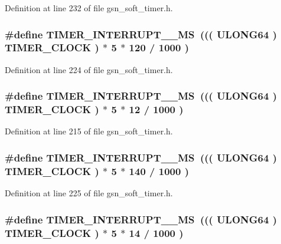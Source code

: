 Definition at line 232 of file gsn\_\-soft\_\-timer.h.

\hypertarget{a00673_ga8911ab7a7dcc03f488617e3f11cd5d5b}{
\subsubsection[{TIMER\_\-INTERRUPT\_\-600\_\-MS}]{\setlength{\rightskip}{0pt plus 5cm}\#define TIMER\_\-INTERRUPT\_\_\-MS~((( {\bf ULONG64} ) TIMER\_\-CLOCK ) $\ast$ 5 $\ast$ 120 / 1000 )}}
\label{a00673_ga8911ab7a7dcc03f488617e3f11cd5d5b}


Definition at line 224 of file gsn\_\-soft\_\-timer.h.

\hypertarget{a00673_ga05c2fdd777df5b88de99e08ab97b882b}{
\subsubsection[{TIMER\_\-INTERRUPT\_\-60\_\-MS}]{\setlength{\rightskip}{0pt plus 5cm}\#define TIMER\_\-INTERRUPT\_\_\-MS~((( {\bf ULONG64} ) TIMER\_\-CLOCK ) $\ast$ 5 $\ast$ 12 / 1000 )}}
\label{a00673_ga05c2fdd777df5b88de99e08ab97b882b}


Definition at line 215 of file gsn\_\-soft\_\-timer.h.

\hypertarget{a00673_ga444096811394aa490ec470aa1894e703}{
\subsubsection[{TIMER\_\-INTERRUPT\_\-700\_\-MS}]{\setlength{\rightskip}{0pt plus 5cm}\#define TIMER\_\-INTERRUPT\_\_\-MS~((( {\bf ULONG64} ) TIMER\_\-CLOCK ) $\ast$ 5 $\ast$ 140 / 1000 )}}
\label{a00673_ga444096811394aa490ec470aa1894e703}


Definition at line 225 of file gsn\_\-soft\_\-timer.h.

\hypertarget{a00673_ga2e708b60d3621f4c13bcd07001696d57}{
\subsubsection[{TIMER\_\-INTERRUPT\_\-70\_\-MS}]{\setlength{\rightskip}{0pt plus 5cm}\#define TIMER\_\-INTERRUPT\_\_\-MS~((( {\bf ULONG64} ) TIMER\_\-CLOCK ) $\ast$ 5 $\ast$ 14 / 1000 )}}
\label{a00673_ga2e708b60d3621f4c13bcd07001696d57}


